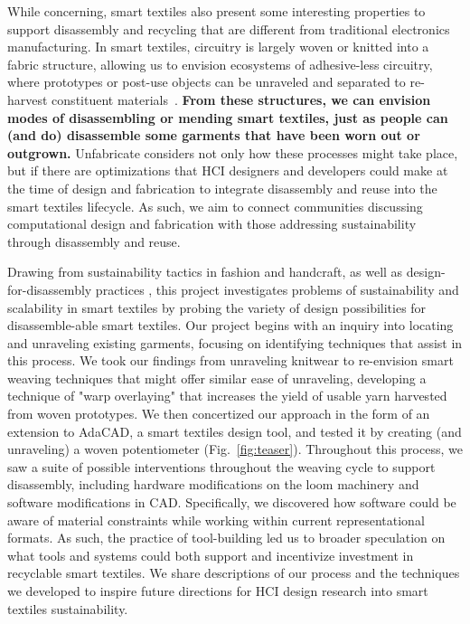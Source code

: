 \documentclass{sigchi}
\begin{document}
While concerning, smart textiles also present some interesting properties to support disassembly and recycling that are different from traditional electronics manufacturing. In smart textiles, circuitry is largely woven or knitted into a fabric structure, allowing us to envision ecosystems of adhesive-less circuitry, where prototypes or post-use objects can be unraveled and separated to re-harvest constituent materials~\cite{zysset_weaving_2010}. \textbf{From these structures, we can envision modes of disassembling or mending smart textiles, just as people can (and do) disassemble some garments that have been worn out or outgrown.} Unfabricate considers not only how these processes might take place, but if there are optimizations that HCI designers and developers could make at the time of design and fabrication to integrate disassembly and reuse into the smart textiles lifecycle. As such, we aim to connect communities discussing computational design and fabrication with those addressing sustainability through disassembly and reuse.

Drawing from sustainability tactics in fashion and handcraft, as well as design-for-disassembly practices \cite{webster_dfd,circular_disassembly}, this project investigates problems of sustainability and scalability in smart textiles by probing the variety of design possibilities for disassemble-able smart textiles. Our project begins with an inquiry into locating and unraveling existing garments, focusing on identifying techniques that assist in this process. We took our findings from unraveling knitwear to re-envision smart weaving techniques that might offer similar ease of unraveling, developing a technique of "warp overlaying" that increases the yield of usable yarn harvested from woven prototypes. We then concertized our approach in the form of an extension to AdaCAD, a smart textiles design tool, and tested it by creating (and unraveling) a woven potentiometer (Fig.~\ref{fig:teaser}). Throughout this process, we saw a suite of possible interventions throughout the weaving cycle to support disassembly, including hardware modifications on the loom machinery and software modifications in CAD. Specifically, we discovered how software could be aware of material constraints while working within current representational formats. As such, the practice of tool-building led us to broader speculation on what tools and systems could both support and incentivize investment in recyclable smart textiles. We share descriptions of our process and the techniques we developed to inspire future directions for HCI design research into smart textiles sustainability.
 
\end{document}
